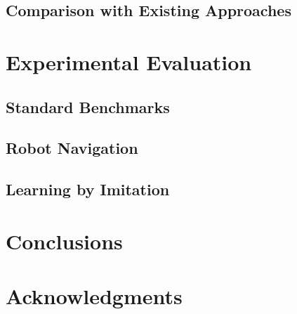\documentclass[journal]{IEEEtran}
\begin{document}
\subsection{Comparison with Existing Approaches}
\label{subsec:comparison}


\section{Experimental Evaluation}
\label{sec:exp}


\subsection{Standard Benchmarks}
\label{sec:exp1}


\subsection{Robot Navigation}
\label{sec:exp2}


\subsection{Learning by Imitation}
\label{sec:exp3}


\section{Conclusions}
\label{sec:conclusions}


\section*{Acknowledgments}

{\small


}





\end{document}
